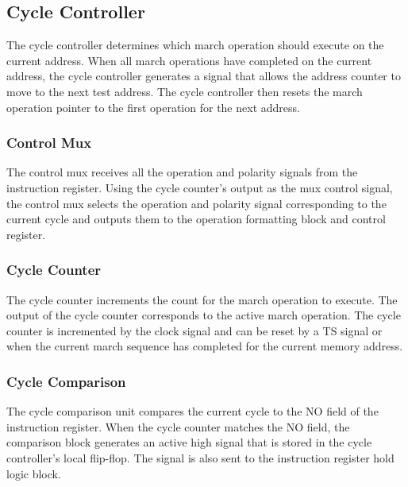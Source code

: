 \subsection{Cycle Controller}
\label{sect:bg-blocks-cycle-controller}
The cycle controller determines which march operation should execute on the current address.  When all march operations have completed on the current address, the cycle controller generates a signal that allows the address counter to move to the next test address.  The cycle controller then resets the march operation pointer to the first operation for the next address.   

\subsubsection{Control Mux}
The control mux receives all the operation and polarity signals from the instruction register.  Using the cycle counter's output as the mux control signal, the control mux selects the operation and polarity signal corresponding to the current cycle and outputs them to the operation formatting block and control register.  

\subsubsection{Cycle Counter}
The cycle counter increments the count for the march operation to execute.  The output of the cycle counter corresponds to the active march operation.  The cycle counter is incremented by the clock signal and can be reset by a TS signal or when the current march sequence has completed for the current memory address. 

\subsubsection{Cycle Comparison}
The cycle comparison unit compares the current cycle to the NO field of the instruction register.  When the cycle counter matches the NO field, the comparison block generates an active high signal that is stored in the cycle controller's local flip-flop.  The signal is also sent to the instruction register hold logic block.  


